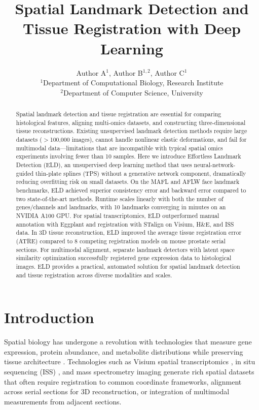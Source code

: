 \documentclass[11pt]{article}
\title{Spatial Landmark Detection and Tissue Registration with Deep Learning}
\author{Author A$^{1}$, Author B$^{1,2}$, Author C$^{1}$ \\
\small $^{1}$Department of Computational Biology, Research Institute \\
\small $^{2}$Department of Computer Science, University}
\date{}
\begin{document}
\maketitle

\begin{abstract}
Spatial landmark detection and tissue registration are essential for comparing histological features, aligning multi-omics datasets, and constructing three-dimensional tissue reconstructions. Existing unsupervised landmark detection methods require large datasets ($>$100,000 images), cannot handle nonlinear elastic deformations, and fail for multimodal data---limitations that are incompatible with typical spatial omics experiments involving fewer than 10 samples. Here we introduce Effortless Landmark Detection (ELD), an unsupervised deep learning method that uses neural-network-guided thin-plate splines (TPS) without a generative network component, dramatically reducing overfitting risk on small datasets. On the MAFL and AFLW face landmark benchmarks, ELD achieved superior consistency error and backward error compared to two state-of-the-art methods. Runtime scales linearly with both the number of genes/channels and landmarks, with 10 landmarks converging in minutes on an NVIDIA A100 GPU. For spatial transcriptomics, ELD outperformed manual annotation with Eggplant and registration with STalign on Visium, H\&E, and ISS data. In 3D tissue reconstruction, ELD improved the average tissue registration error (ATRE) compared to 8 competing registration models on mouse prostate serial sections. For multimodal alignment, separate landmark detectors with latent space similarity optimization successfully registered gene expression data to histological images. ELD provides a practical, automated solution for spatial landmark detection and tissue registration across diverse modalities and scales.
\end{abstract}

\section{Introduction}

Spatial biology has undergone a revolution with technologies that measure gene expression, protein abundance, and metabolite distributions while preserving tissue architecture \citep{stahl2016visualization, moses2022museum}. Technologies such as Visium spatial transcriptomics \citep{visium_10x2020}, in situ sequencing (ISS) \citep{iss_method2013}, and mass spectrometry imaging \citep{mass_spec_imaging2019} generate rich spatial datasets that often require registration to common coordinate frameworks, alignment across serial sections for 3D reconstruction, or integration of multimodal measurements from adjacent sections.
\end{document}
